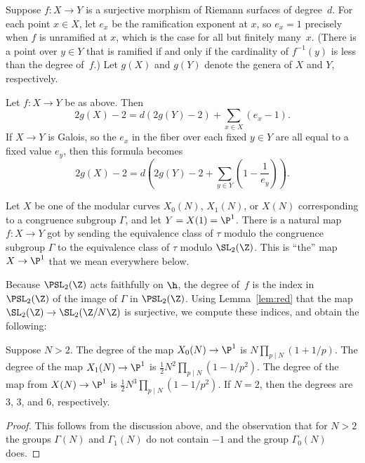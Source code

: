\documentclass{report}
\begin{document}
Suppose $f : X\to Y$ is a surjective morphism of Riemann surfaces
of degree~$d$.  For each point $x\in X$, let $e_x$ be the
ramification exponent at $x$, so $e_x=1$ precisely when $f$ is
unramified at $x$, which is the case for all but finitely
many~$x$.  (There is a point over $y\in Y$ that is ramified if and
only if the cardinality of $f^{-1}(y)$ is less than the degree
of~$f$.) Let $g(X)$ and $g(Y)$ denote the genera of $X$ and $Y$,
respectively.
\begin{theorem}
Let $f:X\to Y$ be as above.  Then
\[
   2g(X)-2 = d(2g(Y)-2) + \sum_{x\in X} (e_x - 1).
\]
If $X\to Y$ is Galois, so the $e_x$ in the fiber over each fixed $y\in
Y$ are all equal to a fixed value $e_y$, then this formula becomes
\[
   2g(X) - 2 = d\left(2g(Y) - 2 + \sum_{y\in Y}
   \left(1-\frac{1}{e_y}\right)\right).
\]
\end{theorem}

Let $X$ be one of the modular curves $X_0(N)$, $X_1(N)$, or $X(N)$
corresponding to a congruence subgroup $\Gamma$, and let
$Y=X(1)=\P^1$. There is a natural map $f:X\to Y$ got by sending
the equivalence class of $\tau$ modulo the congruence subgroup
$\Gamma$ to the equivalence class of $\tau$ modulo $\SL_2(\Z)$.
This is ``the'' map $X\to \P^1$ that we mean everywhere below.

Because $\PSL_2(\Z)$ acts faithfully on $\h$, the degree of~$f$ is the
index in $\PSL_2(\Z)$ of the image of $\Gamma$ in $\PSL_2(\Z)$.  Using
Lemma~\ref{lem:red} that the map $\SL_2(\Z)\to \SL_2(\Z/N\Z)$ is
surjective, we compute these indices, and obtain the following:
\begin{proposition}\label{prop:modcurvedegree}
Suppose $N>2$.  The degree of the map $X_0(N)\to \P^1$ is
$N\prod_{p\mid N}(1+1/p)$.  The degree of the map $X_1(N)\to \P^1$
is $\frac{1}{2}N^2\prod_{p\mid N}(1-1/p^2)$. The degree of the map
from $X(N)\to \P^1$ is $\frac{1}{2}N^3\prod_{p\mid N}(1-1/p^2)$.
If $N=2$, then the degrees are $3$, $3$, and $6$, respectively.
\end{proposition}
\begin{proof}
  This follows from the discussion above, and the observation that for
  $N>2$ the groups $\Gamma(N)$ and $\Gamma_1(N)$ do not contain $-1$
  and the group $\Gamma_0(N)$ does.
\end{proof}
\end{document}

